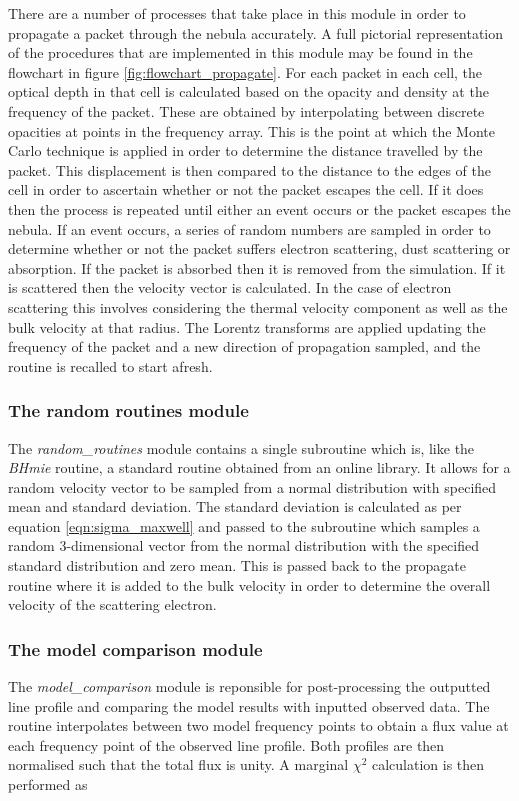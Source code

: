 		There are a number of processes that take place in this module in order to propagate a packet through the nebula accurately.  A full pictorial representation of the procedures that are implemented in this module may be found in the flowchart in figure \ref{fig:flowchart_propagate}. For each packet in each cell, the optical depth in that cell is calculated based on the opacity and density at the frequency of the packet.  These are obtained by interpolating between discrete opacities at points in the frequency array.  This is the point at which the Monte Carlo technique is applied in order to determine the distance travelled by the packet.  This displacement is then compared to the distance to the edges of the cell in order to ascertain whether or not the packet escapes the cell.  If it does then the process is repeated until either an event occurs or the packet escapes the nebula.  If an event occurs, a series of random numbers are sampled in order to determine whether or not the packet suffers electron scattering, dust scattering or absorption.  If the packet is absorbed then it is removed from the simulation.  If it is scattered then the velocity vector is calculated.  In the case of electron scattering this involves considering the thermal velocity component as well as the bulk velocity at that radius.  The Lorentz transforms are applied updating the frequency of the packet and a new direction of propagation sampled, and the routine is recalled to start afresh. 
	
		\subsubsection{The random routines module}
		The \textit{random\_routines} module contains a single subroutine which is, like the \textit{BHmie} routine, a standard routine obtained from an online library.  It allows for a random velocity vector to be sampled from a normal distribution with specified mean and standard deviation.  The standard deviation is calculated as per equation \ref{eqn:sigma_maxwell} and passed to the subroutine which samples a random 3-dimensional vector from the normal distribution with the specified standard distribution and zero mean.  This is passed back to the propagate routine where it is added to the bulk velocity in order to determine the overall velocity of the scattering electron.
		
		\subsubsection{The model comparison module}
		The \textit{model\_comparison} module is reponsible for post-processing the outputted line profile and comparing the model results with inputted observed data.  The routine interpolates between two model frequency points to obtain a flux value at each frequency point of the observed line profile.  Both profiles are then normalised such that the total flux is unity.  A marginal $\chi^2$ calculation is then performed as 
		
